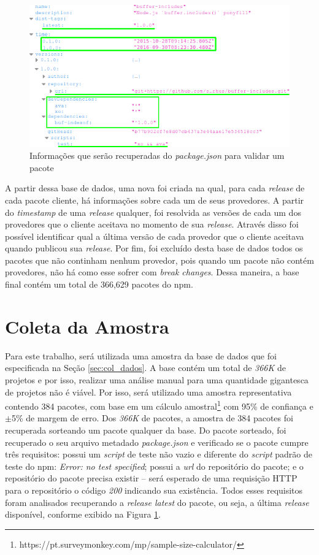 \begin{figure}
    \centering
    \includegraphics[scale=0.5]{figuras/package_json.png}
    \caption{Informações que serão recuperadas do \textit{package.json} para validar um pacote}
    \label{fig:package_json}
\end{figure}{}

A partir dessa base de dados, uma nova foi criada na qual, para cada \textit{release} de cada pacote cliente, há informações sobre cada um de seus provedores. A partir do \textit{timestamp} de uma \textit{release} qualquer, foi resolvida as versões de cada um dos provedores que o cliente aceitava no momento de sua \textit{release}. Através disso foi possível identificar qual a última versão de cada provedor que o cliente aceitava quando publicou sua \textit{release}. Por fim, foi excluído desta base de dados todos os pacotes que não continham nenhum provedor, pois quando um pacote não contém provedores, não há como esse sofrer com \textit{break changes}. Dessa maneira, a base final contém um total de 366,629 pacotes do \gls{npm}.

\section{Coleta da Amostra}
\label{sec:col_amostra}
Para este trabalho, será utilizada uma amostra da base de dados que foi especificada na Seção \ref{sec:col_dados}. A base contém um total de \textit{366K} de projetos e por isso, realizar uma análise manual para uma quantidade gigantesca de projetos não é viável. Por isso, será utilizado uma amostra representativa contendo 384 pacotes, com base em um cálculo amostral\footnote{https://pt.surveymonkey.com/mp/sample-size-calculator/} com 95\% de confiança e $\pm$5\% de margem de erro. Dos \textit{366K} de pacotes, a amostra de 384 pacotes foi recuperada sorteando um pacote qualquer da base. Do pacote sorteado, foi recuperado o seu arquivo metadado \textit{package.json} e verificado se o pacote cumpre três requisitos: possui um \textit{script} de teste não vazio e diferente do \textit{script} padrão de teste do \gls{npm}: \textit{Error: no test specified}; possui a \textit{url} do repositório do pacote; e o repositório do pacote precisa existir -- será esperado de uma requisição \Gls{HTTP} para o repositório o código \textit{200} indicando sua existência. Todos esses requisitos foram analisados recuperando a \textit{release latest} do pacote, ou seja, a última \textit{release} disponível, conforme exibido na Figura \ref{fig:package_json}.

